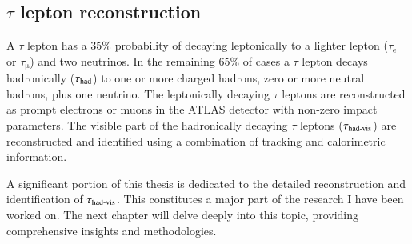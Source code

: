     \subsection{$\tau$ lepton reconstruction}
        A $\tau$ lepton has a 35\% probability of decaying leptonically to a lighter lepton ($\tau_\mathrm{e}$ or $\tau_\mathrm{\mu}$) and two neutrinos. 
        In the remaining 65\% of cases a $\tau$ lepton decays hadronically ($\tau_{\text{had}}$) to one or more charged hadrons, zero or more
        neutral hadrons, plus one neutrino. 
        The leptonically decaying $\tau$ leptons are reconstructed as prompt electrons or muons in the ATLAS detector with non-zero impact parameters. 
        The visible part of the hadronically decaying $\tau$ leptons ($\tau_{\text{had-vis}}$) are reconstructed and identified using a combination of tracking and calorimetric information. 

        A significant portion of this thesis is dedicated to the detailed reconstruction and identification of $\tau_{\text{had-vis}}$. 
        This constitutes a major part of the research I have been worked on. 
        The next chapter will delve deeply into this topic, providing comprehensive insights and methodologies.